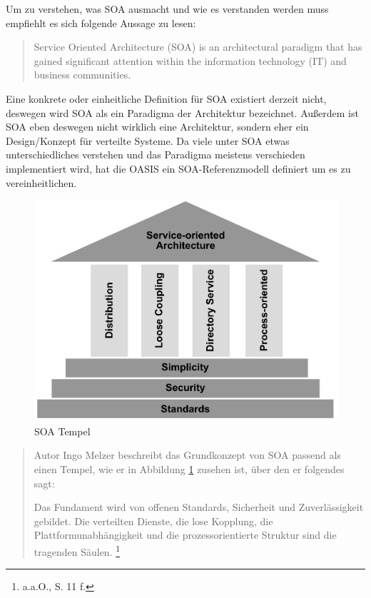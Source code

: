 Um zu verstehen, was \ac{SOA} ausmacht und wie es verstanden werden muss empfiehlt es sich folgende Aussage zu lesen:

\begin{quote}
\glqq{}Service Oriented Architecture (SOA) is an architectural paradigm that has gained significant attention within the information technology (IT) and business communities.\grqq{} \autocite[][]{oasisspec}
\end{quote}

Eine konkrete oder einheitliche Definition für \ac{SOA} existiert derzeit nicht, deswegen wird \ac{SOA} als ein Paradigma der Architektur bezeichnet. Außerdem ist \ac{SOA} eben deswegen nicht wirklich eine Architektur, sondern eher ein Design/Konzept für verteilte Systeme. Da viele unter \ac{SOA} etwas unterschiedliches verstehen und das Paradigma meistens verschieden implementiert wird, hat die \ac{OASIS} ein \ac{SOA}-Referenzmodell definiert um es zu vereinheitlichen\autocites[Vgl.][11]{soamws}[Vgl.][2\psq]{soaidp}[Vgl.][]{oasis}.

\begin{figure}[H]
\centering
\includegraphics[width=\pictureWidth cm]{Bilder/Sonstiges/SOA_Tempel_Melzer.pdf}
\caption{SOA Tempel\label{fig:soatempel}\protect\footnotemark}%
\end{figure}
\begin{quote}

Autor Ingo Melzer beschreibt das Grundkonzept von \ac{SOA} passend als einen Tempel, wie er in Abbildung \ref{fig:soatempel} zusehen ist, über den er folgendes sagt:

 \glqq{}Das Fundament wird von offenen Standards, Sicherheit und Zuverlässigkeit gebildet. Die verteilten Dienste, die lose Kopplung, die Plattformunabhängigkeit und die prozessorientierte Struktur sind die tragenden Säulen.\grqq{} \footnote{a.a.O., S. 11 f.}
\end{quote}

